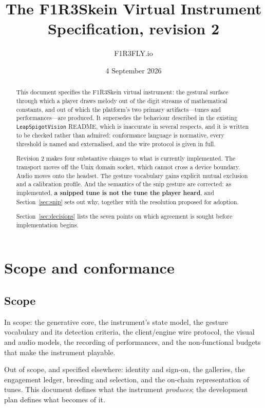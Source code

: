 \documentclass[11pt,a4paper]{article}
\title{\textbf{The F1R3Skein Virtual Instrument}\\[0.3em]
\large Specification, revision 2}
\author{F1R3FLY.io}
\date{4 September 2026}
\theoremstyle{definition}
\theoremstyle{plain}
\theoremstyle{remark}
\begin{document}
\maketitle

\begin{abstract}
\noindent
This document specifies the F1R3Skein virtual instrument: the gestural surface through which a
player draws melody out of the digit streams of mathematical constants, and out of which the
platform's two primary artifacts---tunes and performances---are produced. It supersedes the
behaviour described in the existing \texttt{LeapSpigotVision} README, which is inaccurate in
several respects, and it is written to be checked rather than admired: conformance language is
normative, every threshold is named and externalised, and the wire protocol is given in full.

Revision 2 makes four substantive changes to what is currently implemented. The transport moves off
the Unix domain socket, which cannot cross a device boundary. Audio moves onto the headset. The
gesture vocabulary gains explicit mutual exclusion and a calibration profile. And the semantics of
the snip gesture are corrected: as implemented, \textbf{a snipped tune is not the tune the player
heard}, and Section~\ref{sec:snip} sets out why, together with the resolution proposed for
adoption.

Section~\ref{sec:decisions} lists the seven points on which agreement is sought before
implementation begins.
\end{abstract}

\tableofcontents

\section{Scope and conformance}

\subsection{Scope}

In scope: the generative core, the instrument's state model, the gesture vocabulary and its
detection criteria, the client/engine wire protocol, the visual and audio models, the recording of
performances, and the non-functional budgets that make the instrument playable.

Out of scope, and specified elsewhere: identity and sign-on, the galleries, the engagement ledger,
breeding and selection, and the on-chain representation of tunes. This document defines what the
instrument \emph{produces}; the development plan defines what becomes of it.
\end{document}
